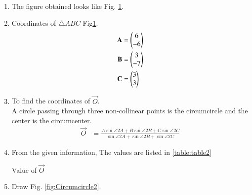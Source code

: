 \renewcommand{\theequation}{\theenumi}
\begin{enumerate}[label=\thesection.\arabic*.,ref=\thesection.\theenumi]

\begin{figure}[!ht]
\centering
\resizebox{\columnwidth}{!}{}
\caption{Circumcircle by Latex-Tikz}
\label{fig:Circumcircle}	
\end{figure}

\item The figure obtained looks like Fig. \ref{fig:Circumcircle}.\\ 

\item Coordinates of $\triangle ABC$ Fig\ref{fig:Circumcircle}. \\
\begin{align}
\mathbf{A} &=\begin{pmatrix}6\\-6\end{pmatrix} \label{eq:constr_a}\\
\mathbf{B} &=\begin{pmatrix}3\\-7\end{pmatrix} \label{eq:constr_b}\\
\mathbf{C} &=\begin{pmatrix}3\\3\end{pmatrix} \label{eq:constr_c}
\end{align}

\item To find the coordinates of $\vec{O}$. \\
\solution A circle passing through three non-collinear points is the circumcircle and the center is the circumcenter.\\
\begin{align}
\vec{O} &= \frac{A\sin{\angle 2A} + B\sin{\angle 2B} + C\sin{\angle 2C}}{\sin{\angle 2A} + \sin{\angle 2B} + \sin{\angle 2C}}
\end{align}

\item
From the given information, 
The values are listed in \ref{table:table2}\\
\begin{table}[ht!]
\centering

\caption{Value of $\vec{O}$}
\label{table:table2}	
\end{table} 

\item Draw Fig. \ref{fig:Circumcircle2}.


\end{enumerate}
